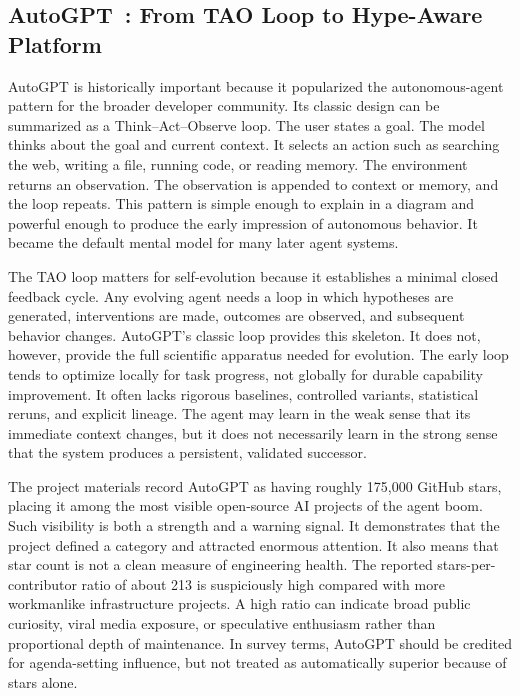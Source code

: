\subsection{AutoGPT~\cite{autogpt2023}: From TAO Loop to Hype-Aware Platform}
\label{subsec:autogpt}

AutoGPT is historically important because it popularized the autonomous-agent pattern for the broader developer community.  Its classic design can be summarized as a Think--Act--Observe loop.  The user states a goal.  The model thinks about the goal and current context.  It selects an action such as searching the web, writing a file, running code, or reading memory.  The environment returns an observation.  The observation is appended to context or memory, and the loop repeats.  This pattern is simple enough to explain in a diagram and powerful enough to produce the early impression of autonomous behavior.  It became the default mental model for many later agent systems.

The TAO loop matters for self-evolution because it establishes a minimal closed feedback cycle.  Any evolving agent needs a loop in which hypotheses are generated, interventions are made, outcomes are observed, and subsequent behavior changes.  AutoGPT's classic loop provides this skeleton.  It does not, however, provide the full scientific apparatus needed for evolution.  The early loop tends to optimize locally for task progress, not globally for durable capability improvement.  It often lacks rigorous baselines, controlled variants, statistical reruns, and explicit lineage.  The agent may learn in the weak sense that its immediate context changes, but it does not necessarily learn in the strong sense that the system produces a persistent, validated successor.

The project materials record AutoGPT as having roughly 175,000 GitHub stars, placing it among the most visible open-source AI projects of the agent boom.  Such visibility is both a strength and a warning signal.  It demonstrates that the project defined a category and attracted enormous attention.  It also means that star count is not a clean measure of engineering health.  The reported stars-per-contributor ratio of about 213 is suspiciously high compared with more workmanlike infrastructure projects.  A high ratio can indicate broad public curiosity, viral media exposure, or speculative enthusiasm rather than proportional depth of maintenance.  In survey terms, AutoGPT should be credited for agenda-setting influence, but not treated as automatically superior because of stars alone.

